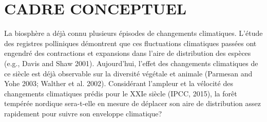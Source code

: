 \section*{\uppercase{CADRE CONCEPTUEL}}

La biosphère a déjà connu plusieurs épisodes de changements climatiques. L'étude des registres
polliniques démontrent que ces fluctuations climatiques passées ont engendré des contractions et
expansions dans l'aire de distribution des espèces (e.g., Davis and Shaw 2001). Aujourd'hui, l'effet
des changements climatiques de ce siècle est déjà observable sur la diversité végétale et animale (Parmesan and Yohe 2003; Walther et
al. 2002). Considérant l'ampleur et la vélocité des changements climatiques prédis pour le XXIe
siècle (IPCC, 2015), la forêt tempérée nordique sera-t-elle en mesure de déplacer son aire de
distribution assez rapidement pour suivre son enveloppe climatique?

